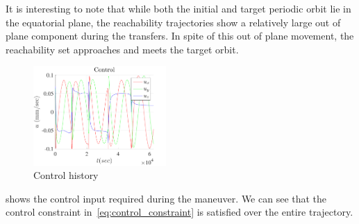 It is interesting to note that while both the initial and target periodic orbit lie in the equatorial plane, the reachability trajectories show a relatively large out of plane component during the transfers.
In spite of this out of plane movement, the reachability set approaches and meets the target orbit. 
\begin{figure}
    \centering
    \includegraphics[width=0.45\textwidth]{figures/2016_AAS/control.pdf}
    \caption{Control history \label{fig:control}}
\end{figure}
 shows the control input required during the maneuver.
We can see that the control constraint in~\cref{eq:control_constraint} is satisfied over the entire trajectory.
